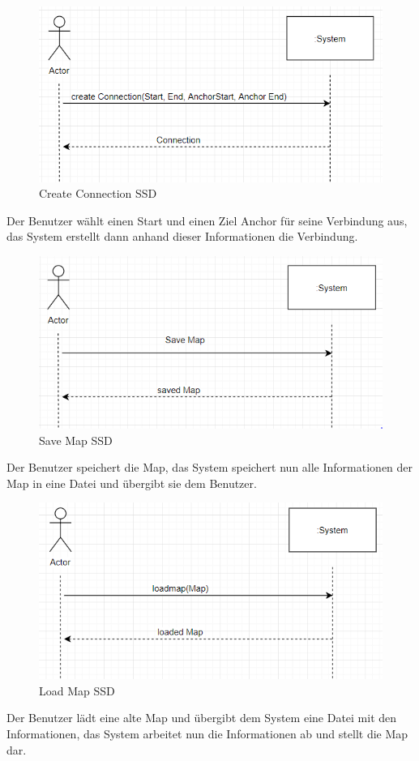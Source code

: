 \begin{figure}[H]
	\centering
		\includegraphics[scale=0.7]{images/createconnection.PNG}
	\caption{Create Connection SSD}
	\label{fig:create_connection_ssd}
\end{figure}
Der Benutzer wählt einen Start und einen Ziel Anchor für seine Verbindung aus, das System erstellt
dann anhand dieser Informationen die Verbindung.

\begin{figure}[H]
	\centering
		\includegraphics[scale=0.7]{images/savemap.PNG}
	\caption{Save Map SSD}
	\label{fig:save_map_ssd}
\end{figure}
Der Benutzer speichert die Map, das System speichert nun alle Informationen der Map in eine
Datei und übergibt sie dem Benutzer.

\begin{figure}[H]
	\centering
		\includegraphics[scale=0.7]{images/loadmap.PNG}
	\caption{Load Map SSD}
	\label{fig:load_map_ssd}
\end{figure}
Der Benutzer lädt eine alte Map und übergibt dem System eine Datei mit den Informationen, das System
arbeitet nun die Informationen ab und stellt die Map dar.

